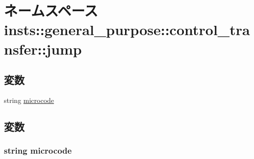 \hypertarget{namespaceinsts_1_1general__purpose_1_1control__transfer_1_1jump}{
\section{ネームスペース insts::general\_\-purpose::control\_\-transfer::jump}
\label{namespaceinsts_1_1general__purpose_1_1control__transfer_1_1jump}
}
\subsection*{変数}
\begin{DoxyCompactItemize}
\item 
string \hyperlink{namespaceinsts_1_1general__purpose_1_1control__transfer_1_1jump_a770f11a173e99389a8802f0107ed8f52}{microcode}
\end{DoxyCompactItemize}


\subsection{変数}
\hypertarget{namespaceinsts_1_1general__purpose_1_1control__transfer_1_1jump_a770f11a173e99389a8802f0107ed8f52}{
\subsubsection[{microcode}]{\setlength{\rightskip}{0pt plus 5cm}string {\bf microcode}}}
\label{namespaceinsts_1_1general__purpose_1_1control__transfer_1_1jump_a770f11a173e99389a8802f0107ed8f52}
